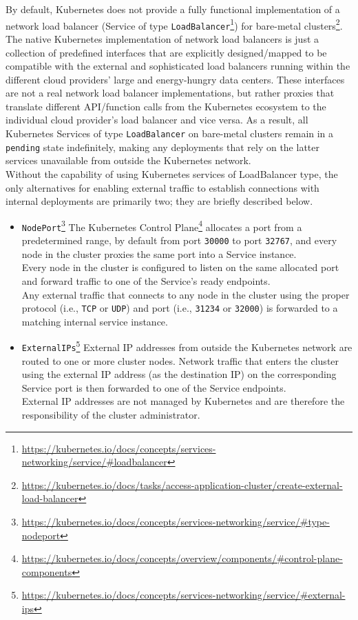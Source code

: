 By default, Kubernetes does not provide a fully functional implementation of a network
load balancer (Service of type \texttt{LoadBalancer}\footnote{\url{https://kubernetes.io/docs/concepts/services-networking/service/\#loadbalancer}})
for bare-metal clusters\footnote{\url{https://kubernetes.io/docs/tasks/access-application-cluster/create-external-load-balancer}}.
The native Kubernetes implementation of network load balancers is just a collection
of predefined interfaces that are explicitly designed/mapped to be compatible with
the external and sophisticated load balancers running within the different cloud
providers' large and energy-hungry data centers. These interfaces are not a real
network load balancer implementations, but rather proxies that translate
different API/function calls from the Kubernetes ecosystem to the individual
cloud provider's load balancer and vice versa. As a result, all Kubernetes
Services of type \texttt{LoadBalancer} on bare-metal clusters remain in a \texttt{pending}
state indefinitely, making any deployments that rely on the latter services unavailable
from outside the Kubernetes network\cite{metallb}. \\ %
Without the capability of using Kubernetes services of LoadBalancer type, the only
alternatives for enabling external traffic to establish connections with internal
deployments are primarily two; they are briefly described below.
\begin{itemize}
  \item \texttt{NodePort}\footnote{\url{https://kubernetes.io/docs/concepts/services-networking/service/\#type-nodeport}}
    \newline
    The Kubernetes Control Plane\footnote{\url{https://kubernetes.io/docs/concepts/overview/components/\#control-plane-components}}
    allocates a port from a predetermined range, by default from port \texttt{30000}
    to port \texttt{32767}, and every node in the cluster proxies the same port
    into a Service instance. \\ %
    Every node in the cluster is configured to listen on the same allocated port
    and forward traffic to one of the Service's ready endpoints. \\ %
    Any external traffic that connects to any node in the cluster using the
    proper protocol (i.e., \texttt{TCP} or \texttt{UDP}) and port (i.e., \texttt{31234}
    or \texttt{32000}) is forwarded to a matching internal service instance\cite{k8s_service_node_port}.

  \item \texttt{ExternalIPs}\footnote{\url{https://kubernetes.io/docs/concepts/services-networking/service/\#external-ips}}
    \newline
    External IP addresses from outside the Kubernetes network are routed to one
    or more cluster nodes. Network traffic that enters the cluster using the external
    IP address (as the destination IP) on the corresponding Service port is then
    forwarded to one of the Service endpoints. \\ %
    External IP addresses are not managed by Kubernetes and are therefore the responsibility
    of the cluster administrator\cite{k8s_service_external_ips}.
\end{itemize}

